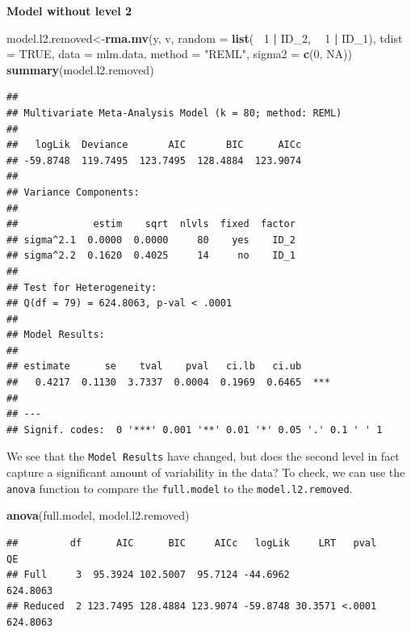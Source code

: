 \documentclass[]{book}
\newenvironment{Shaded}{\begin{snugshade}}{\end{snugshade}}
\newcommand{\DataTypeTok}[1]{\textcolor[rgb]{0.13,0.29,0.53}{#1}}
\newcommand{\DecValTok}[1]{\textcolor[rgb]{0.00,0.00,0.81}{#1}}
\newcommand{\KeywordTok}[1]{\textcolor[rgb]{0.13,0.29,0.53}{\textbf{#1}}}
\newcommand{\NormalTok}[1]{#1}
\newcommand{\OperatorTok}[1]{\textcolor[rgb]{0.81,0.36,0.00}{\textbf{#1}}}
\newcommand{\OtherTok}[1]{\textcolor[rgb]{0.56,0.35,0.01}{#1}}
\newcommand{\StringTok}[1]{\textcolor[rgb]{0.31,0.60,0.02}{#1}}
\begin{document}
\textbf{Model without level 2}

\begin{Shaded}
\begin{Highlighting}[]
\NormalTok{model.l2.removed<-}\KeywordTok{rma.mv}\NormalTok{(y, }
\NormalTok{                   v, }
                   \DataTypeTok{random =} \KeywordTok{list}\NormalTok{(}\OperatorTok{~}\StringTok{ }\DecValTok{1} \OperatorTok{|}\StringTok{ }\NormalTok{ID_}\DecValTok{2}\NormalTok{, }
                                 \OperatorTok{~}\StringTok{ }\DecValTok{1} \OperatorTok{|}\StringTok{ }\NormalTok{ID_}\DecValTok{1}\NormalTok{), }
                   \DataTypeTok{tdist =} \OtherTok{TRUE}\NormalTok{, }
                   \DataTypeTok{data =}\NormalTok{ mlm.data,}
                   \DataTypeTok{method =} \StringTok{"REML"}\NormalTok{,}
                   \DataTypeTok{sigma2 =} \KeywordTok{c}\NormalTok{(}\DecValTok{0}\NormalTok{, }\OtherTok{NA}\NormalTok{))}
\KeywordTok{summary}\NormalTok{(model.l2.removed)}
\end{Highlighting}
\end{Shaded}

\begin{verbatim}
## 
## Multivariate Meta-Analysis Model (k = 80; method: REML)
## 
##   logLik  Deviance       AIC       BIC      AICc  
## -59.8748  119.7495  123.7495  128.4884  123.9074  
## 
## Variance Components: 
## 
##             estim    sqrt  nlvls  fixed  factor
## sigma^2.1  0.0000  0.0000     80    yes    ID_2
## sigma^2.2  0.1620  0.4025     14     no    ID_1
## 
## Test for Heterogeneity: 
## Q(df = 79) = 624.8063, p-val < .0001
## 
## Model Results:
## 
## estimate      se    tval    pval   ci.lb   ci.ub     
##   0.4217  0.1130  3.7337  0.0004  0.1969  0.6465  ***
## 
## ---
## Signif. codes:  0 '***' 0.001 '**' 0.01 '*' 0.05 '.' 0.1 ' ' 1
\end{verbatim}

We see that the \texttt{Model\ Results} have changed, but does the second level in fact capture a significant amount of variability in the data? To check, we can use the \texttt{anova} function to compare the \texttt{full.model} to the \texttt{model.l2.removed}.

\begin{Shaded}
\begin{Highlighting}[]
\KeywordTok{anova}\NormalTok{(full.model, model.l2.removed)}
\end{Highlighting}
\end{Shaded}

\begin{verbatim}
##         df      AIC      BIC     AICc   logLik     LRT   pval       QE
## Full     3  95.3924 102.5007  95.7124 -44.6962                624.8063
## Reduced  2 123.7495 128.4884 123.9074 -59.8748 30.3571 <.0001 624.8063
\end{verbatim}
\end{document}
